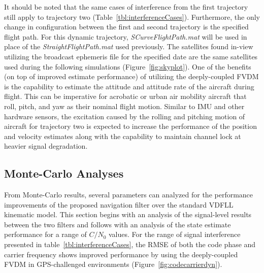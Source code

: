 It should be noted that the same cases of interference from the first trajectory still apply to trajectory two (Table~\ref{tbl:interferenceCases}). Furthermore, the only change in configuration between the first and second trajectory is the specified flight path. For this dynamic trajectory, \textit{SCurveFlightPath.mat} will be used in place of the \textit{StraightFlightPath.mat} used previously. The satellites found in-view utilizing the broadcast ephemeris file for the specified date are the same satellites used during the following simulations (Figure~\ref{fig:skyplot}). One of the benefits (on top of improved estimate performance) of utilizing the deeply-coupled FVDM is the capability to estimate the attitude and attitude rate of the aircraft during flight. This can be imperative for acrobatic or urban air mobility aircraft that roll, pitch, and yaw as their nominal flight motion. Similar to IMU and other hardware sensors, the excitation caused by the rolling and pitching motion of aircraft for trajectory two is expected to increase the performance of the position and velocity estimates along with the capability to maintain channel lock at heavier signal degradation.

\subsection{\textbf{Monte-Carlo Analyses}}
From Monte-Carlo results, several parameters can analyzed for the performance improvements of the proposed navigation filter over the standard VDFLL kinematic model. This section begins with an analysis of the signal-level results between the two filters and follows with an analysis of the state estimate performance for a range of \(C/N_0\) values. For the range of signal interference presented in table~\ref{tbl:interferenceCases}, the RMSE of both the code phase and carrier frequency shows improved performance by using the deeply-coupled FVDM in GPS-challenged environments (Figure~\ref{fig:codecarrierdyn}).

